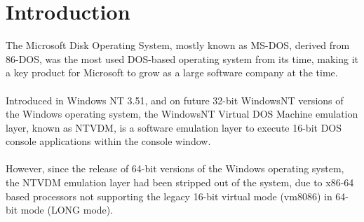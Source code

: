 \chapter{Introduction}

The Microsoft Disk Operating System, mostly known as MS-DOS, derived from 86-DOS,
was the most used DOS-based operating system from its time, making it a key product for
Microsoft to grow as a large software company at the time.
\\\\
Introduced in Windows NT 3.51, and on future 32-bit WindowsNT versions of the Windows
operating system, the WindowsNT Virtual DOS Machine emulation layer, known as
NTVDM, is a software emulation layer to execute 16-bit DOS console applications within
the console window.
\\\\
However, since the release of 64-bit versions of the Windows operating system, the
NTVDM emulation layer had been stripped out of the system, due to x86-64 based
processors not supporting the legacy 16-bit virtual mode (vm8086) in 64-bit mode (LONG
mode).